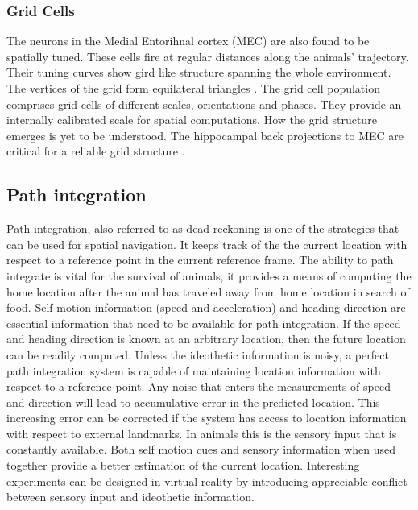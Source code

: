 \subsubsection{Grid Cells}
The neurons in the Medial Entorihnal cortex (MEC) are also found to be spatially tuned. These cells fire at regular distances along the animals' trajectory. Their tuning curves show gird like structure spanning the whole environment. The vertices of the grid form equilateral triangles \cite{Hafting2005}. The grid cell population comprises grid cells of different scales, orientations and phases. They provide an internally  calibrated scale for spatial computations. How the grid structure emerges is yet to be understood. The hippocampal back projections to MEC are critical for a reliable grid structure \cite{Bonnevie2013}. 

\subsection{Path integration}
\label{pathIntgr}
Path integration, also referred to as dead reckoning is one of the strategies that can be used for spatial navigation. It keeps track of the the current location with respect to a reference point in the current reference frame. The ability to path integrate is vital for the survival of animals, it provides a means of computing the home location after the animal has traveled away from home location in search of food.
Self motion information (speed and acceleration) and heading direction are essential information that need to be available for path integration. If the speed and heading direction is known at an arbitrary location, then the future location can be readily computed. Unless the ideothetic information is noisy, a perfect path integration system is capable of maintaining location information with respect to a reference point. Any noise that enters the measurements of speed and direction will lead to accumulative error in the predicted location. This increasing error can be corrected if the system has access to location information with respect to external landmarks. In animals this is the sensory input that is constantly available. Both self motion cues and sensory information when used together provide a better estimation of the current location. Interesting experiments can be designed in virtual reality by introducing appreciable conflict between sensory input and ideothetic information. 

